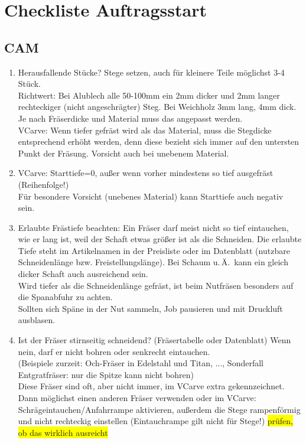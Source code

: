 \documentclass{\basedir/fablab-document}
\renewcommand{\todo}[1]{\colorbox{yellow}{{#1}}}
\begin{document}
\section{Checkliste Auftragsstart}
\subsection{CAM}
\begin{enumerate}
	\item Herausfallende Stücke? Stege setzen, auch für kleinere Teile möglichst 3-4 Stück.\\Richtwert: Bei Alublech alle 50-100mm ein 2mm dicker und 2mm langer rechteckiger (nicht angeschrägter) Steg. Bei Weichholz 3mm lang, 4mm dick. Je nach Fräserdicke und Material muss das angepasst werden.\\
VCarve: Wenn tiefer gefräst wird als das Material, muss die Stegdicke entsprechend erhöht werden, denn diese bezieht sich immer auf den untersten Punkt der Fräsung. Vorsicht auch bei unebenem Material.
	\item VCarve: Starttiefe=0, außer wenn vorher mindestens so tief ausgefräst (Reihenfolge!)\\
Für besondere Vorsicht (unebenes Material) kann Starttiefe auch negativ sein.
	\item Erlaubte Frästiefe beachten: Ein Fräser darf meist nicht so tief eintauchen, wie er lang ist, weil der Schaft etwas größer ist als die Schneiden. Die erlaubte Tiefe steht im Artikelnamen in der Preisliste oder im Datenblatt (nutzbare Schneidenlänge bzw. Freistellungslänge).
Bei Schaum u.\,Ä.\ kann ein gleich dicker Schaft auch ausreichend sein. \\
Wird tiefer als die Schneidenlänge gefräst, ist beim Nutfräsen besonders auf die Spanabfuhr zu achten. \\
Sollten sich Späne in der Nut sammeln, Job pausieren und mit Druckluft ausblasen.
	\item Ist der Fräser stirnseitig schneidend? (Fräsertabelle oder Datenblatt) Wenn nein, darf er nicht bohren oder senkrecht eintauchen.\\
(Beispiele zurzeit: Och-Fräser in Edelstahl und Titan, ..., Sonderfall Entgratfräser: nur die Spitze kann nicht bohren)\\
Diese Fräser sind oft, aber nicht immer, im VCarve extra gekennzeichnet.\\
Dann möglichst einen anderen Fräser verwenden oder im VCarve: Schrägeintauchen/Anfahrrampe aktivieren, außerdem die Stege rampenförmig und nicht rechteckig einstellen (Eintauchrampe gilt nicht für Stege!)  \todo{prüfen, ob das wirklich ausreicht}\\

\end{enumerate}
\end{document}
